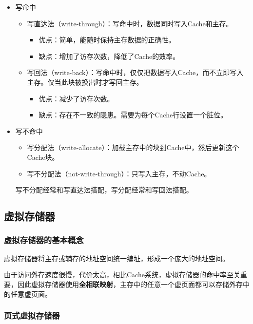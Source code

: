 \documentclass[12pt, a4paper, oneside]{ctexart}
\begin{document}
\begin{itemize}
  \item 写命中
  \begin{itemize}
    \item 写直达法（write-through）：写命中时，数据同时写入Cache和主存。
    \begin{itemize}
      \item 优点：简单，能随时保持主存数据的正确性。
      \item 缺点：增加了访存次数，降低了Cache的效率。
    \end{itemize}
    \item 写回法（write-back）：写命中时，仅仅把数据写入Cache，而不立即写入主存。仅当此块被换出时才写回主存。
    \begin{itemize}
      \item 优点：减少了访存次数。
      \item 缺点：存在不一致的隐患。需要为每个Cache行设置一个脏位。
    \end{itemize}
  \end{itemize}
  \item 写不命中
  \begin{itemize}
    \item 写分配法（write-allocate）：加载主存中的块到Cache中，然后更新这个Cache块。
    \item 写不分配法（not-write-through）：只写入主存，不动Cache。
  \end{itemize}
  写不分配经常和写直达法搭配，写分配经常和写回法搭配。
\end{itemize}

\subsection{虚拟存储器}

\subsubsection{虚拟存储器的基本概念}

虚拟存储器将主存或辅存的地址空间统一编址，形成一个庞大的地址空间。

由于访问外存速度很慢，代价太高，相比Cache系统，虚拟存储器的命中率至关重要，因此虚拟存储器使用\textbf{全相联映射}，主存中的任意一个虚页面都可以存储外存中的任意虚页面。

\subsubsection{页式虚拟存储器}
\end{document}
